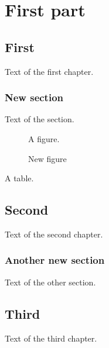 \documentclass{report}
\begin{document}
\dominitoc
\dominilof
\dominilot
\doparttoc
\dopartlof
\dopartlot
\tableofcontents
\listoffigures
\listoftables
\part{First part}
\parttoc
\partlof
\partlot
\chapter{First}
\minitoc
\minilof
\minilot
Text of the first chapter.
\section{New section}
Text of the section.
\begin{figure}[h]
\centering A figure.
\caption{New figure}
\end{figure}
\begin{table}[h]
\centering A table.
\caption{New table}
\end{table}
\chapter{Second}
\minitoc
Text of the second chapter.
\section{Another new section}
Text of the other section.
\chapter{Third}
\minitoc
Text of the third chapter.
\end{document}
